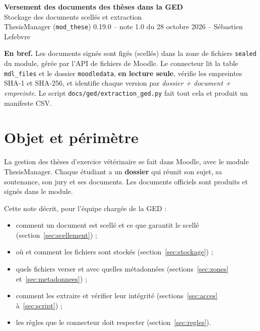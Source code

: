 \documentclass[11pt,a4paper]{article}
\newcommand{\versionguide}{1.0}
\newcommand{\dateguide}{28 octobre 2026}
\newcommand{\versionthese}{0.19.0}
\begin{document}
\begin{center}
  {\LARGE\bfseries\color{moodle} Versement des documents des thèses dans la GED}\\[0.6em]
  {\large Stockage des documents scellés et extraction}\\[0.8em]
  {\small ThesisManager (\texttt{mod\_these}) \versionthese{} -- note \versionguide{} du \dateguide{} -- Sébastien Lefebvre}
\end{center}

\vspace{1em}

\begin{astuce}
\textbf{En bref.} Les documents signés sont figés (\og scellés\fg{}) dans la zone de fichiers
\texttt{sealed} du module, gérée par l'API de fichiers de Moodle. Le connecteur lit la table
\texttt{mdl\_files} et le dossier \texttt{moodledata}, \textbf{en lecture seule}, vérifie les empreintes
SHA-1 et SHA-256, et identifie chaque version par \emph{dossier + document + empreinte}. Le script
\texttt{docs/ged/extraction\_ged.py} fait tout cela et produit un manifeste CSV.
\end{astuce}

\tableofcontents

\section{Objet et périmètre}

La gestion des thèses d'exercice vétérinaire se fait dans Moodle, avec le module ThesisManager. Chaque
étudiant a un \textbf{dossier} qui réunit son sujet, sa soutenance, son jury et ses documents. Les
documents officiels sont produits et signés dans le module.

Cette note décrit, pour l'équipe chargée de la GED :
\begin{itemize}
  \item comment un document est scellé et ce que garantit le scellé (section~\ref{sec:scellement}) ;
  \item où et comment les fichiers sont stockés (section~\ref{sec:stockage}) ;
  \item quels fichiers verser et avec quelles métadonnées (sections~\ref{sec:zones} et~\ref{sec:metadonnees}) ;
  \item comment les extraire et vérifier leur intégrité (sections~\ref{sec:acces} à~\ref{sec:script}) ;
  \item les règles que le connecteur doit respecter (section~\ref{sec:regles}).
\end{itemize}
\end{document}
